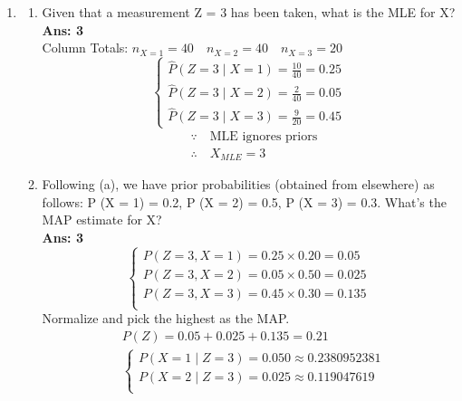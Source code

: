 \documentclass{article}
\theoremstyle{definition}
\theoremstyle{remark}
\begin{document}
\begin{enumerate}[font={\Large\bfseries},left=0pt]
\begin{tcolorbox}
\begin{enumerate}
\begin{enumerate}
            \item \begin{enumerate}
                \item Given that a measurement Z = 3 has been taken, what is the MLE for X? \\
                \textbf{Ans: 3} \\
                Column Totals: $n_{X=1} = 40 \quad n_{X=2} = 40 \quad n_{X=3} = 20$ \\
                $$
                \begin{cases}
                    \hat{P}(Z = 3 \mid X = 1) = \frac{10}{40} = 0.25 \\
                    \hat{P}(Z = 3 \mid X = 2) = \frac{2}{40} = 0.05 \\
                    \hat{P}(Z = 3 \mid X = 3) = \frac{9}{20} = 0.45 
                \end{cases} 
                $$
                \begin{align}
                    &\because \quad \text{MLE ignores priors} \\
                    &\therefore \quad X_{MLE} = 3
                \end{align}
                \item Following (a), we have prior probabilities (obtained from elsewhere) as follows: P (X = 1) = 0.2, P (X = 2) = 0.5, P (X = 3) = 0.3. What’s the MAP estimate for X? \\
                \textbf{Ans: 3} \\
                $$
                \begin{cases}
                    P(Z = 3, X = 1) = 0.25 \times 0.20 = 0.05 \\
                    P(Z = 3, X = 2) = 0.05 \times 0.50 = 0.025 \\
                    P(Z = 3, X = 3) = 0.45 \times 0.30 = 0.135 \\             
                \end{cases}
                $$
                Normalize and pick the highest as the MAP.
                \begin{align}
                &P(Z) = 0.05 + 0.025 + 0.135 = 0.21 \\
                &\begin{cases}
                    P(X = 1 \mid Z = 3) = 0.050 \approx 0.2380952381 \\
                    P(X = 2 \mid Z = 3) = 0.025 \approx 0.119047619 \\

\end{cases}
\end{align}
\end{enumerate}
\end{enumerate}
\end{enumerate}
\end{tcolorbox}
\end{enumerate}
\end{document}
